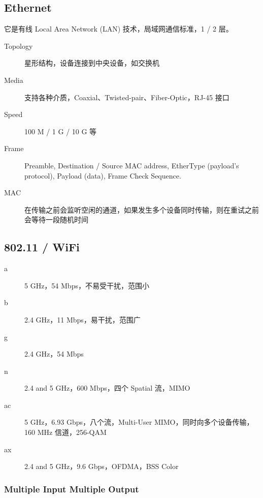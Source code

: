 \documentclass[11pt,journal,compsoc]{IEEEtran}
\begin{document}
\subsection{Ethernet}

它是有线 Local Area Network (LAN) 技术，局域网通信标准，1 / 2 层。

\begin{description}
    \item[Topology] 星形结构，设备连接到中央设备，如交换机

    \item[Media] 支持各种介质，Coaxial、Twisted-pair、Fiber-Optic，RJ-45 接口

    \item[Speed] 100 M / 1 G / 10 G 等

    \item[Frame] Preamble, Destination / Source MAC address, EtherType (payload's protocol), Payload (data), Frame Check Sequence.

    \item[MAC] 在传输之前会监听空闲的通道，如果发生多个设备同时传输，则在重试之前会等待一段随机时间
\end{description}


\subsection{802.11 / WiFi}

\begin{description}
    \item[a] 5 GHz，54 Mbps，不易受干扰，范围小

    \item[b] 2.4 GHz，11 Mbps，易干扰，范围广

    \item[g] 2.4 GHz，54 Mbps

    \item[n] 2.4 and 5 GHz，600 Mbps，四个 Spatial 流，MIMO

    \item[ac] 5 GHz，6.93 Gbps，八个流，Multi-User MIMO，同时向多个设备传输，160 MHz 信道，256-QAM

    \item[ax] 2.4 and 5 GHz，9.6 Gbps，OFDMA，BSS Color
\end{description}


\subsubsection{Multiple Input Multiple Output}
\end{document}
